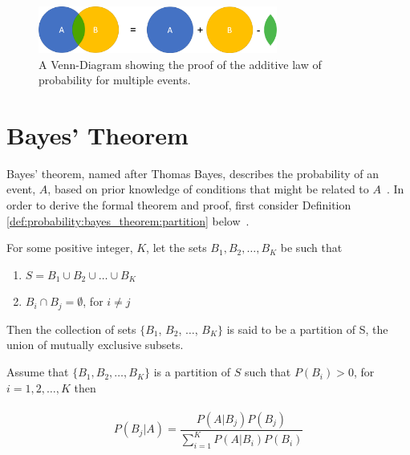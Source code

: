 \begin{figure}[htbp]
      \centering
      \includegraphics[width=0.7\textwidth]{images/additive_law_of_probability_proof.pdf}
      \caption{A Venn-Diagram showing the proof of the additive law of probability for multiple events.}
      \label{fig:probability:multiple_events:additive}
\end{figure}

\section{Bayes' Theorem}\label{sec:probability:bayes_theorem}

Bayes' theorem, named after Thomas Bayes, describes the probability of an event, $A$, based on prior knowledge of conditions that might be related to $A$~\cite{ref:zalta:2015}. In order to derive the formal theorem and proof, first consider Definition \ref{def:probability:bayes_theorem:partition} below~\cite{ref:zalta:2015}.
\\
\begin{definition}
      \label{def:probability:bayes_theorem:partition}
      For some positive integer, $K$, let the sets $B_{1}, B_{2}, \dots, B_{K}$ be such that

      \begin{enumerate}
            \item $S = B_{1} \cup B_{2} \cup \dots \cup B_{K}$
            \item $B_{i} \cap B_{j} = \emptyset$, for $i \neq j$
      \end{enumerate}

      Then the collection of sets $\{B_{1}$, $B_{2}$, $\dots$, $B_{K}\}$ is said to be a partition of S, the union of mutually exclusive subsets.
\end{definition}
\vspace*{0.5cm}

\begin{theorem}
      \label{th:probability:bayes_theorem:theorem}
      Assume that $\{B_{1}, B_{2}, \dots, B_{K}\}$ is a partition of $S$ such that $P(B_{i}) > 0$, for $i = 1,2, \dots, K$ then\\
      \\
      \begin{equation}
            P(B_{j} \vert A) = \frac{P(A \vert B_{j})P(B_{j})}{\sum_{i=1}^{K} P(A \vert B_{i})P(B_{i})}
      \end{equation}
\end{theorem}

